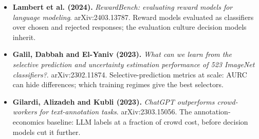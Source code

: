 \documentclass[11pt,letterpaper]{article}
\begin{document}
\begin{itemize}[leftmargin=1.2em,itemsep=3pt]
\item \textbf{Lambert et al. (2024).} \textit{RewardBench: evaluating reward models for language modeling}. arXiv:2403.13787. Reward models evaluated as classifiers over chosen and rejected responses; the evaluation culture decision models inherit.
\item \textbf{Galil, Dabbah and El-Yaniv (2023).} \textit{What can we learn from the selective prediction and uncertainty estimation performance of 523 ImageNet classifiers?}. arXiv:2302.11874. Selective-prediction metrics at scale: AURC can hide differences; which training regimes give the best selectors.
\item \textbf{Gilardi, Alizadeh and Kubli (2023).} \textit{ChatGPT outperforms crowd-workers for text-annotation tasks}. arXiv:2303.15056. The annotation-economics baseline: LLM labels at a fraction of crowd cost, before decision models cut it further.
\end{itemize}
\end{document}
